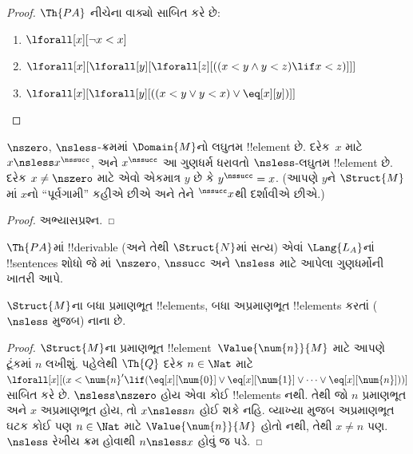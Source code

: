 \documentclass[../../../include/open-logic-section]{subfiles}
\begin{document}
\begin{proof}
$\Th{PA}$ નીચેના વાક્યો સાબિત કરે છે:
\begin{enumerate}
\item $\lforall[x][\lnot x < x]$
\item $\lforall[x][\lforall[y][\lforall[z][((x < y \land y < z) \lif x < z)]]]$
\item $\lforall[x][\lforall[y][((x < y \lor y < x) \lor \eq[x][y])]]$
\end{enumerate}
\end{proof}

\begin{prop}
 $\nszero$, $\nsless$-ક્રમમાં
$\Domain{M}$નો લઘુતમ !!{element} છે. દરેક~$x$ માટે
$x\nsless x^\nssucc$, અને $x^\nssucc$ આ ગુણધર્મ ધરાવતો
$\nsless$-લઘુતમ !!{element} છે. દરેક $x\neq\nszero$ માટે એવો એકમાત્ર
$y$ છે કે $y^\nssucc=x$. (આપણે $y$ને $\Struct{M}$માં $x$નો
``પૂર્વગામી'' કહીએ છીએ અને તેને $^\nssucc x$થી દર્શાવીએ છીએ.)
\end{prop}

\begin{proof}
અભ્યાસપ્રશ્ન.
\end{proof}

\begin{prob}
$\Th{PA}$માં !!{derivable} (અને તેથી $\Struct{N}$માં સત્ય) એવાં
$\Lang{L_A}$નાં !!{sentence}s શોધો જે
માં $\nszero$, $\nssucc$ અને
$\nsless$ માટે આપેલા ગુણધર્મોની ખાતરી આપે.
\end{prob}

\begin{prop}
$\Struct{M}$ના બધા પ્રમાણભૂત !!{element}s, બધા અપ્રમાણભૂત
!!{element}s કરતાં ($\nsless$ મુજબ) નાના છે.
\end{prop}

\begin{proof}
$\Struct{M}$ના પ્રમાણભૂત !!{element}~$\Value{\num{n}}{M}$ માટે આપણે
ટૂંકમાં $n$ લખીશું. પહેલેથી $\Th{Q}$ દરેક $n\in\Nat$ માટે
$\lforall[x][(x<\num{n}'\lif(\eq[x][\num{0}]\lor
\eq[x][\num{1}]\lor\dots\lor\eq[x][\num{n}]))]$ સાબિત કરે છે.
$\nsless\nszero$ હોય એવા કોઈ !!{element}s નથી. તેથી જો $n$
પ્રમાણભૂત અને $x$ અપ્રમાણભૂત હોય, તો $x\nsless n$ હોઈ શકે નહિ.
વ્યાખ્યા મુજબ અપ્રમાણભૂત ઘટક કોઈ પણ $n\in\Nat$ માટે
$\Value{\num{n}}{M}$ હોતો નથી, તેથી $x\neq n$ પણ. $\nsless$ રેખીય
ક્રમ હોવાથી $n\nsless x$ હોવું જ પડે.
\end{proof}
\end{document}
